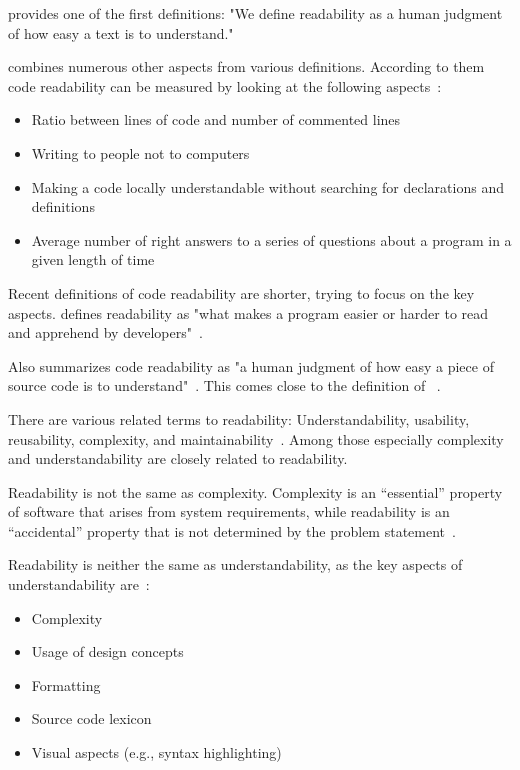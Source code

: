 \documentclass[%
class=scrreprt,
chapterprefix=false,%
open=right,%
twoside=false,%
paper=a4,%
logofile={Logo\_zentral\_farbig\_EN.png},%
thesistype=master,%
UKenglish,%
]{se2thesis}
\theoremstyle{definition}
\begin{document}
	\citeauthor{buse2009learning} provides one of the first definitions: "We define readability as a human judgment of how easy a
	text is to understand."

	\citeauthor{tashtoush2013impact} combines numerous other aspects from various definitions. According to them code readability can be measured by looking at the following aspects~\cite{tashtoush2013impact}:
	\begin{itemize}
		\item Ratio between lines of code and number of commented lines
		\item Writing to people not to computers
		\item Making a code locally understandable without searching for declarations and definitions
		\item Average number of right answers to a series of questions about a program in a given length of time
	\end{itemize}
	
	Recent definitions of code readability are shorter, trying to focus on the key aspects. \citeauthor{oliveira2020evaluating} defines readability as "what makes a program easier or harder to read and apprehend by developers"~\cite{oliveira2020evaluating}.
			
	Also \citeauthor{mi2021effectiveness} summarizes code readability as "a human judgment of how easy a piece of
	source code is to understand"~\cite{mi2021effectiveness}. This comes close to the definition of \citeauthor{buse2009learning}~\cite{buse2009learning}.
	
	There are various related terms to readability: Understandability, usability, reusability, complexity, and maintainability~\cite{tashtoush2013impact}. Among those especially complexity and understandability are closely related to readability.
	
	Readability is not the same as complexity. Complexity is an “essential” property of software that arises
	from system requirements, while readability is an “accidental” property that is not determined by the problem statement~\cite{buse2009learning, brooks1987no}.
	
	Readability is neither the same as understandability, as the key aspects of understandability are~\cite{scalabrino2018comprehensive, martin2009clean, wilson2007beautiful, beck2007implementation}:
	\begin{itemize}
		\item Complexity
		\item Usage of design concepts
		\item Formatting
		\item Source code lexicon
		\item Visual aspects (e.g., syntax highlighting)
	\end{itemize}
	
\end{document}
